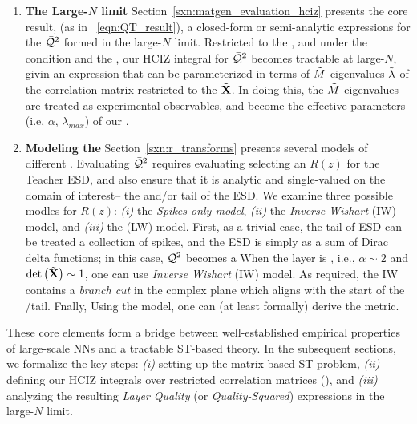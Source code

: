 \begin{enumerate}[label=5.\arabic*]
\item
\textbf{The Large-$N$ limit}
Section~\ref{sxn:matgen_evaluation_hciz} presents the core result,
(as in \EQN~\ref{eqn:QT_result}),
a closed-form or semi-analytic expressions for the \LayerQualitySquared $\bar{\mathcal{Q}}^{2}$
formed in the large-$N$ limit.
Restricted to the \ECS, and under  the \TRACELOG condition and the \IFA, our
HCIZ integral for $\bar{\mathcal{Q}}^{2}$ becomes tractable at large-$N$, givin an expression that can be parameterized
in terms of $\tilde{M}$ eigenvalues $\tilde{\lambda}$ of the \Teacher correlation matrix 
restricted to the \ECS $\tilde{\mathbf{X}}$.
In doing this, the $\tilde{M}$ \Teacher eigenvalues are treated as experimental observables, and 
become the effective \SemiEmpirical parameters (i.e, $\alpha$, $\lambda_{max}$) of our \SETOL.

\item
\textbf{Modeling the \HeavyTailed \RTransform}
Section~\ref{sxn:r_transforms} presents several  models of different \RTransforms.
Evaluating $\bar{\mathcal{Q}}^{2}$ requires evaluating selecting an \RTransform $R(z)$ for the Teacher ESD,
and also ensure that it is analytic and single-valued on the domain of interest-- the \ECS and/or tail of the ESD.
We examine three possible modles for $R(z)$: \emph{(i)} the \emph{Spikes-only model},
\emph{(ii)} the \emph{Inverse Wishart} (IW) model, 
and \emph{(iii)} the  \LevyWigner (LW) model.
First, as a trivial case, the tail of ESD can be treated a collection of spikes,
and the ESD is simply as a sum of Dirac delta functions; in this case,
$\bar{\mathcal{Q}}^{2}$ becomes a 
When the layer is \Ideal, i.e., $\alpha\sim 2$ and $\mbox{}{\text{det}}\left(\tilde{\mathbf{X}}\right)\sim 1$,
one can use  \emph{Inverse Wishart} (IW) model. 
As required, the IW \RTransform contains a \emph{branch cut} in the complex plane
which aligns with the start of the \ECS /\PowerLaw  tail.
Fnally, Using the \LevyWigner model, one can (at least formally) derive the \HTSR \ALPHAHAT metric.

\end{enumerate}

\vspace*{1em}

These core elements form a bridge between well-established empirical properties of large-scale NNs 
and a tractable ST-based theory. In the subsequent sections, we formalize the key steps: 
\emph{(i)} setting up the matrix-based ST problem, \emph{(ii)} defining our HCIZ integrals 
over restricted correlation matrices (\ECS), and \emph{(iii)} analyzing the resulting 
\emph{Layer Quality} (or \emph{Quality-Squared}) expressions in the large-$N$ limit.
